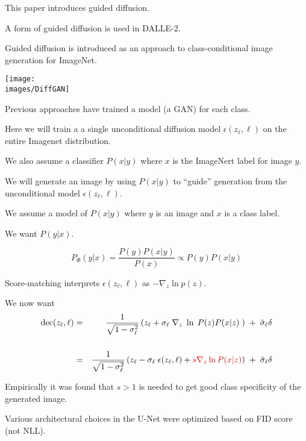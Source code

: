 {This paper introduces guided diffusion.

\vfill
A form of guided diffusion is used in DALLE-2.


Guided diffusion is introduced as an approach to class-conditional image generation for ImageNet.

\vfill
\centerline{\texttt{[image: \\images/DiffGAN]}}


Previous approaches have trained a model (a GAN) for each class.

\vfill
Here we will train a a single unconditional diffusion model $\epsilon(z_\ell,\ell)$ on the entire Imagenet distribution.

\vfill
We also assume a classifier $P(x|y)$ where $x$ is the ImageNert label for image $y$.

\vfill
We will generate an image by using $P(x|y)$ to ``guide'' generation from the unconditional model $\epsilon(z_\ell,\ell)$.


We assume a model of $P(x|y)$ where $y$ is an image and $x$ is a class label.

\vfill
We want $P(y|x)$.

\vfill
$$P_\Phi(y|x) = \frac{P(y)P(x|y)}{P(x)} \propto P(y)P(x|y)$$

\vfill
Score-matching interprets $\epsilon(z_\ell,\ell)$ as $- \nabla_z \ln p(z)$.


We now want
\begin{eqnarray*}
  \mathrm{dec}(z_\ell,\ell) & = & \frac{1}{\sqrt{1-\sigma_\ell^2}}\left(z_\ell + \sigma_\ell\; \nabla_z \;\ln \;P(z)P(x|z)\;\right)\; +\; \tilde{\sigma}_\ell\delta \\
  \\
  & = & \frac{1}{\sqrt{1-\sigma_\ell^2}}\left(z_\ell - \sigma_\ell\; \epsilon(z_\ell,\ell) + {\color{red} s \nabla_{z} \ln P(x|z)}\right)\; +\; \tilde{\sigma}_\ell\delta
\end{eqnarray*}


\vfill
Empirically it was found that $s > 1$ is needed to get good class specificity of the generated image.


Various architectural choices in the U-Net were optimized based on FID score (not NLL).


}
